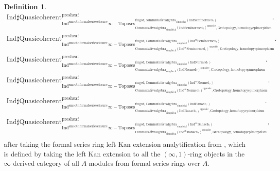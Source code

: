 \documentclass[11pt]{book}
\theoremstyle{definition}
\newtheorem{definition}[theorem]{Definition}
\numberwithin{equation}{section}
\begin{document}
\begin{definition}
 \begin{align}
\mathrm{Ind}\mathrm{\sharp Quasicoherent}^{\text{presheaf}}_{\mathrm{Ind}^\text{smoothformalseriesclosure}\infty-\mathrm{Toposes}^{\mathrm{ringed},\mathrm{commutativealgebra}_{\mathrm{simplicial}}(\mathrm{Ind}\mathrm{Seminormed}_?)}_{\mathrm{Commutativealgebra}_{\mathrm{simplicial}}(\mathrm{Ind}\mathrm{Seminormed}_?)^\mathrm{opposite},\mathrm{Grotopology,homotopyepimorphism}}}. \\
\mathrm{Ind}\mathrm{\sharp Quasicoherent}^{\text{presheaf}}_{\mathrm{Ind}^\text{smoothformalseriesclosure}\infty-\mathrm{Toposes}^{\mathrm{ringed},\mathrm{Commutativealgebra}_{\mathrm{simplicial}}(\mathrm{Ind}^m\mathrm{Seminormed}_?)}_{\mathrm{Commutativealgebra}_{\mathrm{simplicial}}(\mathrm{Ind}^m\mathrm{Seminormed}_?)^\mathrm{opposite},\mathrm{Grotopology,homotopyepimorphism}}}.\\
\mathrm{Ind}\mathrm{\sharp Quasicoherent}^{\text{presheaf}}_{\mathrm{Ind}^\text{smoothformalseriesclosure}\infty-\mathrm{Toposes}^{\mathrm{ringed},\mathrm{Commutativealgebra}_{\mathrm{simplicial}}(\mathrm{Ind}\mathrm{Normed}_?)}_{\mathrm{Commutativealgebra}_{\mathrm{simplicial}}(\mathrm{Ind}\mathrm{Normed}_?)^\mathrm{opposite},\mathrm{Grotopology,homotopyepimorphism}}}.\\
\mathrm{Ind}\mathrm{\sharp Quasicoherent}^{\text{presheaf}}_{\mathrm{Ind}^\text{smoothformalseriesclosure}\infty-\mathrm{Toposes}^{\mathrm{ringed},\mathrm{Commutativealgebra}_{\mathrm{simplicial}}(\mathrm{Ind}^m\mathrm{Normed}_?)}_{\mathrm{Commutativealgebra}_{\mathrm{simplicial}}(\mathrm{Ind}^m\mathrm{Normed}_?)^\mathrm{opposite},\mathrm{Grotopology,homotopyepimorphism}}}.\\
\mathrm{Ind}\mathrm{\sharp Quasicoherent}^{\text{presheaf}}_{\mathrm{Ind}^\text{smoothformalseriesclosure}\infty-\mathrm{Toposes}^{\mathrm{ringed},\mathrm{Commutativealgebra}_{\mathrm{simplicial}}(\mathrm{Ind}\mathrm{Banach}_?)}_{\mathrm{Commutativealgebra}_{\mathrm{simplicial}}(\mathrm{Ind}\mathrm{Banach}_?)^\mathrm{opposite},\mathrm{Grotopology,homotopyepimorphism}}}.\\
\mathrm{Ind}\mathrm{\sharp Quasicoherent}^{\text{presheaf}}_{\mathrm{Ind}^\text{smoothformalseriesclosure}\infty-\mathrm{Toposes}^{\mathrm{ringed},\mathrm{Commutativealgebra}_{\mathrm{simplicial}}(\mathrm{Ind}^m\mathrm{Banach}_?)}_{\mathrm{Commutativealgebra}_{\mathrm{simplicial}}(\mathrm{Ind}^m\mathrm{Banach}_?)^\mathrm{opposite},\mathrm{Grotopology,homotopyepimorphism}}},\\ 
\end{align}
after taking the formal series ring left Kan extension analytification from \cite[Section 4.2]{BBM}, which is defined by taking the left Kan extension to all the $(\infty,1)$-ring objects in the $\infty$-derived category of all $A$-modules from formal series rings over $A$.
\end{definition}
\end{document}
